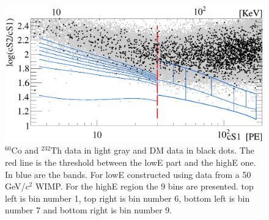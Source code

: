 \begin{table}

\caption{Bins definition. The estimated background event is calculated by taking the calibration sample and scaling it by $6.54\times10^{-3}$, which is the ratio of data and calibration in a sideband. The number of data events is the number of events from the DM data set in each bin.\textcolor{blue}{I changed this table as well a bit}} \label{table:BinDef}

\end{table}


\begin{figure}[h!]
\begin{minipage}{1\linewidth}
\centerline{\includegraphics[width=1\linewidth]{Figures/eft_sr.eps}}
\end{minipage}
\caption{$^{60}\mathrm{Co}$ and $^{232}\mathrm{Th}$ data in light gray and DM data in black dots. The red line is the threshold between the lowE part and the highE one. In blue are the bands. For lowE constructed using data from a 50 GeV/$c^2$ WIMP. For the highE region the 9 bins are presented. top left is bin number 1,  top right is bin number 6, bottom left is bin number 7 and bottom right is bin number 9.}
\label{fig:phasespace}
\end{figure}  





